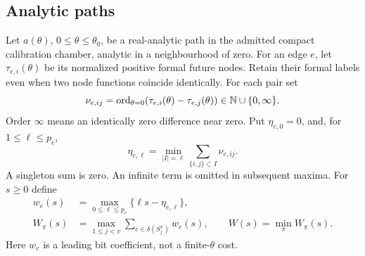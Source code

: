 \subsection{Analytic paths}
Let $a(\theta)$, $0\le\theta\le\theta_0$, be a real-analytic path
in the admitted compact calibration chamber, analytic in a
neighbourhood of zero. For an edge $e$, let $\tau_{e,i}(\theta)$
be its normalized positive formal future nodes. Retain their formal
labels even when two node functions coincide identically. For each
pair set
\[
 \nu_{e,ij}=\operatorname{ord}_{\theta=0}
                  (\tau_{e,i}(\theta)-\tau_{e,j}(\theta))
                  \in\mathbb N\cup\{0,\infty\}.
\]
Order $\infty$ means an identically zero difference near zero. Put
$\eta_{e,0}=0$, and, for $1\le\ell\le p_e$,
\begin{equation}\label{eq:v26-contact-volumes}
 \eta_{e,\ell}=\min_{|I|=\ell}
                    \sum_{\{i,j\}\subset I}\nu_{e,ij}.
\end{equation}
A singleton sum is zero. An infinite term is omitted in subsequent
maxima. For $s\ge0$ define
\begin{equation}\label{eq:v26-tropical-width}
 \begin{split}
 w_e(s)&=\max_{0\le\ell\le p_e}\{\ell s-\eta_{e,\ell}\},\\
 W_\pi(s)&=\max_{1\le j<v}\sum_{e\in\delta(S_j^\pi)}w_e(s),
 \qquad W(s)=\min_\pi W_\pi(s).
 \end{split}
\end{equation}
Here $w_e$ is a leading bit coefficient, not a finite-$\theta$ cost.

